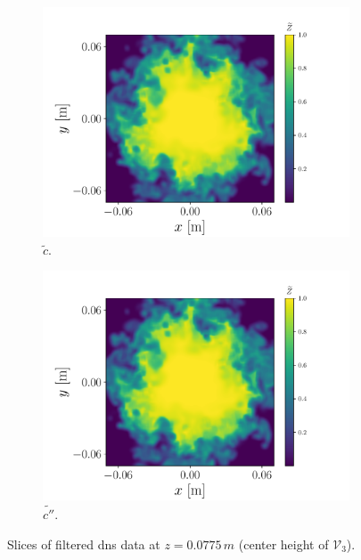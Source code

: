 \documentclass[review]{elsarticle}
\newcommand{\wt}[1]{\widetilde{#1}}
\begin{document}
\begin{figure}[!tbp]
\begin{subfigure}[t]{0.48\textwidth}
    \includegraphics[page=3,width=\textwidth]{./figs/dice_0004_slice.pdf}%
    \caption{$\wt{c}$.}%
 \end{subfigure}\hfill%
  \begin{subfigure}[t]{0.48\textwidth}%
    \includegraphics[page=4,width=\textwidth]{./figs/dice_0004_slice.pdf}%
    \caption{$\wt{c''}$.}%
  \end{subfigure}
  \caption{Slices of filtered \gls{dns} data at $z=0.0775\,\unit{m}$ (center height of $\mathcal{V}_3$).}\label{fig:slices}%
\end{figure}%
\end{document}

